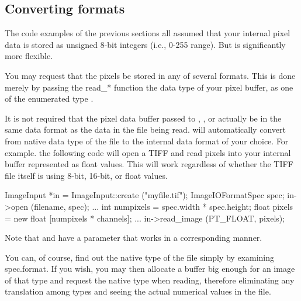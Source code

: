 \subsection{Converting formats}
\label{sec:imageinput:convertingformat}

The code examples of the previous sections all assumed that your
internal pixel data is stored as unsigned 8-bit integers (i.e., 0-255
range).  But \product is significantly more flexible.  

You may request that the pixels be stored in any of several formats.
This is done merely by passing the {\cf read_*} function the data type
of your pixel buffer, as one of the enumerated type \ParamBaseType.


It is not required that the pixel data buffer passed to \readimage,
\readscanline, or \readtile actually be in the same data format as the
data in the file being read.  \product will automatically convert from
native data type of the file to the internal data format of your choice.
For example. the following code will open a TIFF and read pixels into
your internal buffer represented as {\cf float} values.  This will work
regardless of whether the TIFF file itself is using 8-bit, 16-bit, or
float values.

\begin{code}
        ImageInput *in = ImageInput::create ("myfile.tif");
        ImageIOFormatSpec spec;
        in->open (filename, spec);
        ...
        int numpixels = spec.width * spec.height;
        float pixels = new float [numpixels * channels];
        ...
        in->read_image (PT_FLOAT, pixels);
\end{code}

\noindent Note that \readscanline and \readtile have a parameter that
works in a corresponding manner.

You can, of course, find out the native type of the file simply by
examining {\cf spec.format}.  If you wish, you may then allocate a
buffer big enough for an image of that type and request the native type
when reading, therefore eliminating any translation among types and
seeing the actual numerical values in the file.

